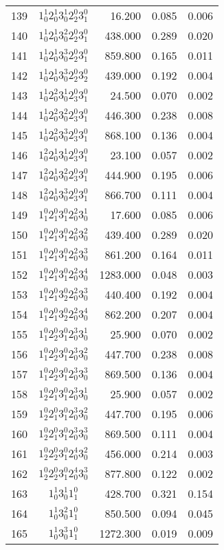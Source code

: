 \begin{table}
\begin{tabular}{rcrrr}
139&$1_0^1 2_0^1 3_0^1 2_2^0 3_1^0$& 16.200& 0.085& 0.006\\
140&$1_0^1 2_0^1 3_0^2 2_2^0 3_1^0$& 438.000& 0.289& 0.020\\
141&$1_0^1 2_0^1 3_0^3 2_2^0 3_1^0$& 859.800& 0.165& 0.011\\
142&$1_0^1 2_0^1 3_0^3 2_2^0 3_2^0$& 439.000& 0.192& 0.004\\
143&$1_0^1 2_0^2 3_0^1 2_3^0 3_1^0$& 24.500& 0.070& 0.002\\
144&$1_0^1 2_0^2 3_0^2 2_3^0 3_1^0$& 446.300& 0.238& 0.008\\
145&$1_0^1 2_0^2 3_0^3 2_3^0 3_1^0$& 868.100& 0.136& 0.004\\
146&$1_0^2 2_0^1 3_0^1 2_3^0 3_1^0$& 23.100& 0.057& 0.002\\
147&$1_0^2 2_0^1 3_0^2 2_3^0 3_1^0$& 444.900& 0.195& 0.006\\
148&$1_0^2 2_0^1 3_0^3 2_3^0 3_1^0$& 866.700& 0.111& 0.004\\
149&$1_1^0 2_1^0 3_1^0 2_0^2 3_0^1$& 17.600& 0.085& 0.006\\
150&$1_1^0 2_1^0 3_1^0 2_0^2 3_0^2$& 439.400& 0.289& 0.020\\
151&$1_1^0 2_1^0 3_1^0 2_0^2 3_0^3$& 861.200& 0.164& 0.011\\
152&$1_1^0 2_1^0 3_1^0 2_0^2 3_0^4$& 1283.000& 0.048& 0.003\\
153&$1_1^0 2_1^0 3_2^0 2_0^2 3_0^3$& 440.400& 0.192& 0.004\\
154&$1_1^0 2_1^0 3_2^0 2_0^2 3_0^4$& 862.200& 0.207& 0.004\\
155&$1_1^0 2_2^0 3_1^0 2_0^3 3_0^1$& 25.900& 0.070& 0.002\\
156&$1_1^0 2_2^0 3_1^0 2_0^3 3_0^2$& 447.700& 0.238& 0.008\\
157&$1_1^0 2_2^0 3_1^0 2_0^3 3_0^3$& 869.500& 0.136& 0.004\\
158&$1_2^0 2_1^0 3_1^0 2_0^3 3_0^1$& 25.900& 0.057& 0.002\\
159&$1_2^0 2_1^0 3_1^0 2_0^3 3_0^2$& 447.700& 0.195& 0.006\\
160&$1_2^0 2_1^0 3_1^0 2_0^3 3_0^3$& 869.500& 0.111& 0.004\\
161&$1_2^0 2_2^0 3_1^0 2_0^4 3_0^2$& 456.000& 0.214& 0.003\\
162&$1_2^0 2_2^0 3_1^0 2_0^4 3_0^3$& 877.800& 0.122& 0.002\\
163&$1_0^1 3_0^1 1_1^0$& 428.700& 0.321& 0.154\\
164&$1_0^1 3_0^2 1_1^0$& 850.500& 0.094& 0.045\\
165&$1_0^1 3_0^3 1_1^0$& 1272.300& 0.019& 0.009\\

\end{tabular}
\end{table}

